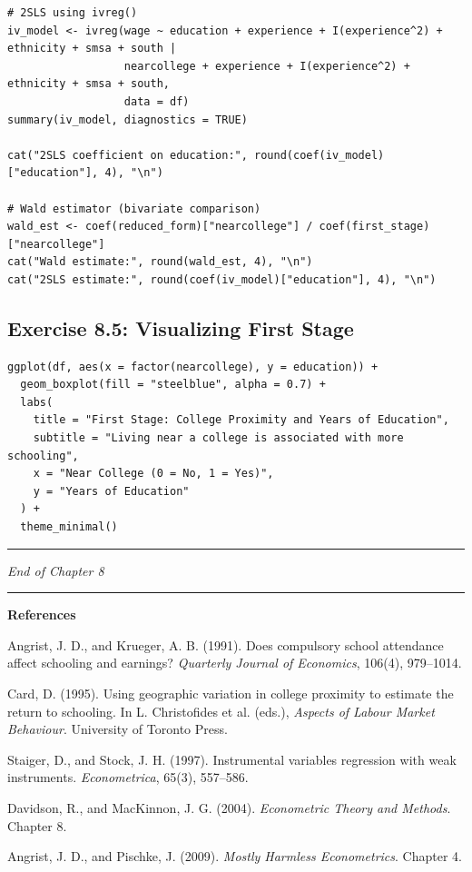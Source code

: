 \begin{lstlisting}
# 2SLS using ivreg()
iv_model <- ivreg(wage ~ education + experience + I(experience^2) + ethnicity + smsa + south |
                  nearcollege + experience + I(experience^2) + ethnicity + smsa + south,
                  data = df)
summary(iv_model, diagnostics = TRUE)

cat("2SLS coefficient on education:", round(coef(iv_model)["education"], 4), "\n")

# Wald estimator (bivariate comparison)
wald_est <- coef(reduced_form)["nearcollege"] / coef(first_stage)["nearcollege"]
cat("Wald estimate:", round(wald_est, 4), "\n")
cat("2SLS estimate:", round(coef(iv_model)["education"], 4), "\n")
\end{lstlisting}

\subsection{Exercise 8.5: Visualizing First Stage}

\begin{lstlisting}
ggplot(df, aes(x = factor(nearcollege), y = education)) +
  geom_boxplot(fill = "steelblue", alpha = 0.7) +
  labs(
    title = "First Stage: College Proximity and Years of Education",
    subtitle = "Living near a college is associated with more schooling",
    x = "Near College (0 = No, 1 = Yes)",
    y = "Years of Education"
  ) +
  theme_minimal()
\end{lstlisting}

\medskip\hrule\medskip

\textit{End of Chapter 8}

\medskip\hrule\medskip

\textbf{References}

Angrist, J. D., and Krueger, A. B. (1991). Does compulsory school attendance affect schooling and earnings? \textit{Quarterly Journal of Economics}, 106(4), 979--1014.

Card, D. (1995). Using geographic variation in college proximity to estimate the return to schooling. In L. Christofides et al. (eds.), \textit{Aspects of Labour Market Behaviour}. University of Toronto Press.

Staiger, D., and Stock, J. H. (1997). Instrumental variables regression with weak instruments. \textit{Econometrica}, 65(3), 557--586.

Davidson, R., and MacKinnon, J. G. (2004). \textit{Econometric Theory and Methods}. Chapter 8.

Angrist, J. D., and Pischke, J. (2009). \textit{Mostly Harmless Econometrics}. Chapter 4.
